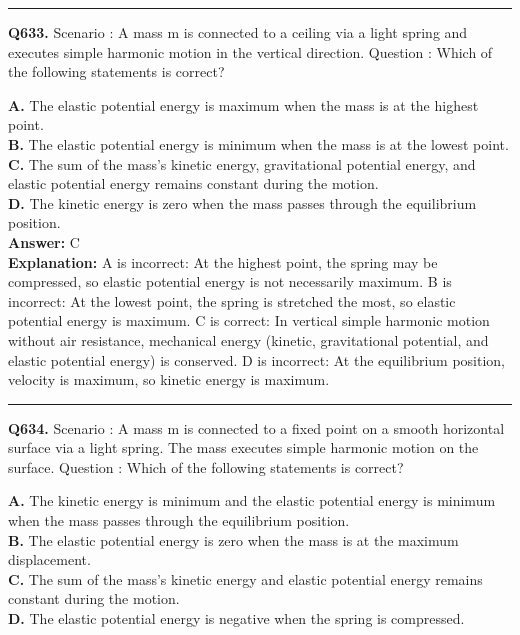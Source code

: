 \documentclass[12pt]{article}
\begin{document}
\hrule
\vspace{1em}


\noindent
\textbf{Q633.} Scenario
: A mass
m
is connected to a ceiling via a light spring and executes simple harmonic motion in the vertical direction.
Question
: Which of the following statements is correct?



\textbf{A.} The elastic potential energy is maximum when the mass is at the highest point. \\
\textbf{B.} The elastic potential energy is minimum when the mass is at the lowest point. \\
\textbf{C.} The sum of the mass's kinetic energy, gravitational potential energy, and elastic potential energy remains constant during the motion. \\
\textbf{D.} The kinetic energy is zero when the mass passes through the equilibrium position. \\

\textbf{Answer:} C \\
\textbf{Explanation:} \cdot 
A is incorrect: At the highest point, the spring may be compressed, so elastic potential energy is not necessarily maximum.
\cdot 
B is incorrect: At the lowest point, the spring is stretched the most, so elastic potential energy is maximum.
\cdot 
C is correct: In vertical simple harmonic motion without air resistance, mechanical energy (kinetic, gravitational potential, and elastic potential energy) is conserved.
\cdot 
D is incorrect: At the equilibrium position, velocity is maximum, so kinetic energy is maximum.

\hrule
\vspace{1em}


\noindent
\textbf{Q634.} Scenario
: A mass
m
is connected to a fixed point on a smooth horizontal surface via a light spring. The mass executes simple harmonic motion on the surface.
Question
: Which of the following statements is correct?



\textbf{A.} The kinetic energy is minimum and the elastic potential energy is minimum when the mass passes through the equilibrium position. \\
\textbf{B.} The elastic potential energy is zero when the mass is at the maximum displacement. \\
\textbf{C.} The sum of the mass's kinetic energy and elastic potential energy remains constant during the motion. \\
\textbf{D.} The elastic potential energy is negative when the spring is compressed. \\
\end{document}
